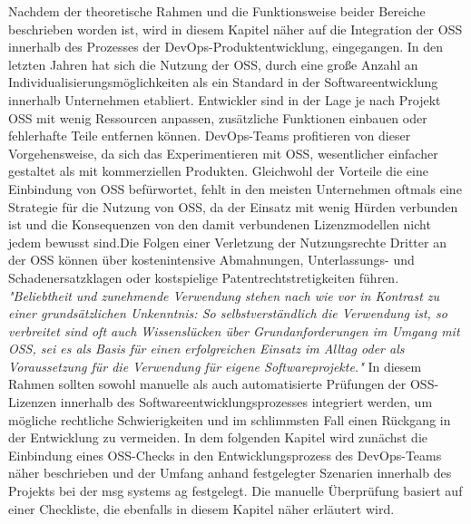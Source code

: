 Nachdem der theoretische Rahmen und die Funktionsweise beider Bereiche beschrieben worden ist, wird in diesem Kapitel näher auf die Integration der OSS innerhalb des Prozesses der DevOps-Produktentwicklung, eingegangen. In den letzten Jahren hat sich die Nutzung der OSS, durch eine große Anzahl an Individualisierungsmöglichkeiten als ein Standard in der Softwareentwicklung innerhalb Unternehmen etabliert. Entwickler sind in der Lage je nach Projekt OSS mit wenig Ressourcen anpassen, zusätzliche Funktionen einbauen oder fehlerhafte Teile entfernen können. DevOps-Teams profitieren von dieser Vorgehensweise, da sich das Experimentieren mit OSS, wesentlicher einfacher gestaltet als mit kommerziellen Produkten. Gleichwohl der Vorteile die eine Einbindung von OSS befürwortet, fehlt in den meisten Unternehmen oftmals eine Strategie für die Nutzung von OSS, da der Einsatz mit wenig Hürden verbunden ist und die Konsequenzen von den damit verbundenen Lizenzmodellen nicht jedem bewusst sind.Die Folgen einer Verletzung der Nutzungsrechte Dritter an der OSS können über kostenintensive Abmahnungen, Unterlassungs- und Schadenersatzklagen oder kostspielige Patentrechtstretigkeiten führen. \textit{"Beliebtheit und zunehmende Verwendung stehen nach wie vor in Kontrast zu einer grundsätzlichen Unkenntnis: So selbstverständlich die Verwendung ist, so verbreitet sind oft auch Wissenslücken über Grundanforderungen im Umgang mit OSS, sei es als Basis für einen erfolgreichen Einsatz im Alltag oder als Voraussetzung für die Verwendung für eigene Softwareprojekte."} \cite{bitkom_ev_open_2016} In diesem Rahmen sollten sowohl manuelle als auch automatisierte Prüfungen der OSS-Lizenzen innerhalb des Softwareentwicklungsprozesses integriert werden, um mögliche rechtliche Schwierigkeiten und im schlimmsten Fall einen Rückgang in der Entwicklung zu vermeiden. In dem folgenden Kapitel wird zunächst die Einbindung eines OSS-Checks in den Entwicklungsprozess des DevOps-Teams näher beschrieben und der Umfang anhand festgelegter Szenarien innerhalb des Projekts bei der msg systems ag festgelegt. Die manuelle Überprüfung basiert auf einer Checkliste, die ebenfalls in diesem Kapitel näher erläutert wird. 






